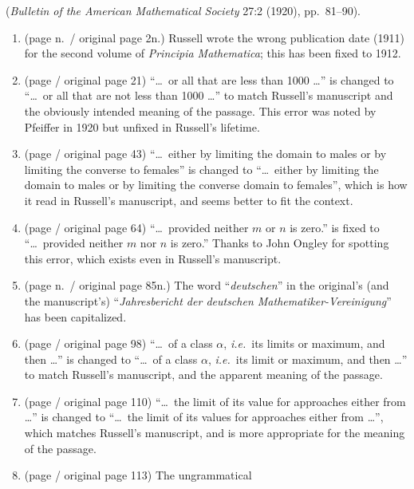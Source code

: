 (\textit{Bulletin of the American Mathematical Society} 27:2 (1920), pp.\ 81--90). 
\begin{enumerate}
 \item (page \pageref{change:pmyear}n.\ / original page 2n.) Russell wrote the wrong 
publication date (1911) for the second volume of \textit{Principia Mathematica};
this has been fixed to 1912.
\item (page \pageref{change:notless} / original page 21) ``\ldots\ or all that are 
less than 1000 \ldots''
is changed to ``\ldots\ or all that are not less than 1000 \ldots'' to
match Russell's manuscript and the obviously intended meaning of the passage.
This error was noted by Pfeiffer in 1920 but unfixed in Russell's lifetime.
\item (page \pageref{change:conversedomain} / original page 43) ``\ldots\ either by limiting the domain to 
males or by limiting the converse to females'' is \aftonly{\linebreak}changed to ``\ldots\ either by limiting the domain to
males or by limiting the converse domain to females'', which is how it read in Russell's manuscript, and 
seems better to fit the context.
\item (page \pageref{change:ornor} / original page 64) ``\ldots\ provided neither $m$ or $n$ is zero.'' 
is fixed to ``\ldots\ provided neither $m$ nor $n$ is zero.'' Thanks to John Ongley
for spotting this error, which exists even in Russell's manuscript.
\item (page \pageref{change:deutschen}n.\ / original page 85n.) The word ``\textit{deutschen}'' in the original's (and the man\-u\-script's) ``\textit{Jahresbericht der 
deutschen Math\-e\-mat\-i\-ker-Ver\-ein\-i\-gung}'' has been capitalized.
\item (page \pageref{change:limitslimit} / original page 98) ``\ldots\ of a 
class $\alpha$, \textit{i.e.}\ its limits or maximum, and then \ldots''
is changed to ``\ldots\ of a 
class $\alpha$, \textit{i.e.}\ its limit or maximum, and then \ldots'' to
match Russell's manuscript, and the apparent meaning of the passage.
\item (page \pageref{change:valuevalues} / original page 110) ``\ldots\ the limit of its value %
for ap\-proach\-es either from \ldots'' is changed to ``\ldots\ the limit of its values %
for ap\-proach\-es either from \ldots'', which matches
Russell's manuscript, and is more appropriate for the meaning of the passage.
\item (page \pageref{change:advantage} / original page 113) The ungrammatical

\end{enumerate}
